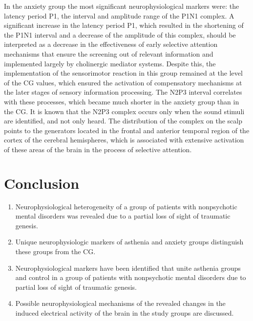 \documentclass[twocolumn]{article}
\begin{document}
\par In the anxiety group the most significant neurophysiological markers were: the latency period P1, the interval and amplitude range of the P1N1 complex. A significant increase in the latency period P1, which resulted in the shortening of the P1N1 interval and a decrease of the amplitude of this complex, should be interpreted as a decrease in the effectiveness of early selective attention mechanisms that ensure the screening out of relevant information and implemented largely by cholinergic mediator systems. Despite this, the implementation of the sensorimotor reaction in this group remained at the level of the CG values, which ensured the activation of compensatory mechanisms at the later stages of sensory information processing. The N2P3 interval correlates with these processes, which became much shorter in the anxiety group than in the CG. It is known that the N2P3 complex occurs only when the sound stimuli are identified, and not only heard\cite{bib35}. The distribution of the complex on the scalp points to the generators located in the frontal and anterior temporal region of the cortex of the cerebral hemispheres, which is associated with extensive activation of these areas of the brain in the process of selective attention.
\section{Conclusion}
\begin{enumerate}
\item Neurophysiological heterogeneity of a group of patients with nonpsychotic mental disorders was revealed due to a partial loss of sight of traumatic genesis.
\item Unique neurophysiologic markers of asthenia and anxiety groups distinguish these groups from the CG.
\item Neurophysiological markers have been identified that unite asthenia groups and control in a group of patients with nonpsychotic mental disorders due to partial loss of sight of traumatic genesis.
\item Possible neurophysiological mechanisms of the revealed changes in the induced electrical activity of the brain in the study groups are discussed.
\end{enumerate}


\end{document}
